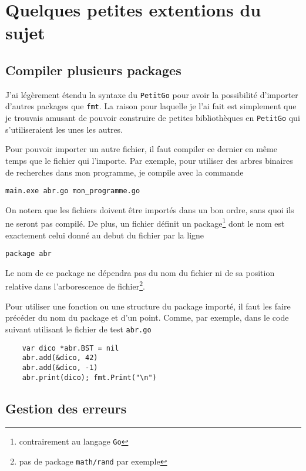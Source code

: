 \documentclass{article}
\begin{document}
\section{Quelques petites extentions du sujet\label{sec:ext}}

\subsection{Compiler plusieurs packages\label{sec:pkg}}

J'ai légèrement étendu la syntaxe du \texttt{PetitGo} pour avoir la possibilité d'importer d'autres packages que \texttt{fmt}. La raison pour laquelle je l'ai fait est simplement que je trouvais amusant de pouvoir construire de petites bibliothèques en \texttt{PetitGo} qui s'utiliseraient les unes les autres.

Pour pouvoir importer un autre fichier, il faut compiler ce dernier en même temps que le fichier qui l'importe. Par exemple, pour utiliser des arbres binaires de recherches dans mon programme, je compile avec la commande

\begin{verbatim}
main.exe abr.go mon_programme.go
\end{verbatim}

On notera que les fichiers doivent être importés dans un bon ordre, sans quoi ils ne seront pas compilé. De plus, un fichier définit un package\footnote{contrairement au langage \texttt{Go}} dont le nom est exactement celui donné au debut du fichier par la ligne

\begin{verbatim}
package abr
\end{verbatim}

Le nom de ce package ne dépendra pas du nom du fichier ni de sa position relative dans l'arborescence de fichier\footnote{pas de package \texttt{math/rand} par exemple}.

Pour utiliser une fonction ou une structure du package importé, il faut les faire précéder du nom du package et d'un point. Comme, par exemple, dans le code suivant utilisant le fichier de test \texttt{abr.go}

\begin{verbatim}
    var dico *abr.BST = nil
    abr.add(&dico, 42)
    abr.add(&dico, -1)
    abr.print(dico); fmt.Print("\n")
\end{verbatim}

\subsection{Gestion des erreurs\label{sec:errors}}
\end{document}
